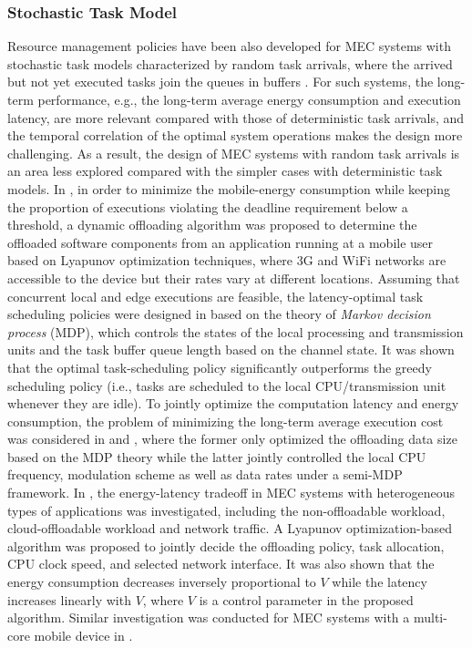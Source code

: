 \documentclass[journal]{IEEEtran}
\begin{document}
\subsubsection{\textbf{Stochastic Task Model}} Resource management policies have been also developed for MEC systems with stochastic task models characterized by random task arrivals, where the arrived but not yet executed tasks join the queues in buffers \cite{DHuangTWC1206,JLiuISIT1607,SChenGLOBECOM1312,hong2016qoe,KwakJSAC1512,ZJiangAccess1511}. For such systems, the long-term performance, e.g., the long-term average energy consumption and execution latency, are more relevant compared with those of deterministic task arrivals, and the temporal correlation of the optimal system operations makes the design more challenging. As a result, the design of MEC systems with random task arrivals is an area less explored compared with the simpler cases with deterministic task models.  In \cite{DHuangTWC1206}, in order to minimize the mobile-energy consumption while keeping the proportion of executions violating the deadline  requirement below a threshold, a dynamic offloading algorithm was proposed to determine the offloaded software components from an application running at a mobile  user based on Lyapunov optimization techniques, where 3G and WiFi networks are accessible to the device but their rates vary at different locations. Assuming that concurrent local and edge executions are feasible, the latency-optimal task scheduling policies were designed  in \cite{JLiuISIT1607} based on the theory of \emph{Markov decision process} (MDP), which controls  the states of the local processing and transmission units and the task buffer queue length based on the  channel state. It was shown that the optimal task-scheduling policy significantly  outperforms the greedy scheduling policy (i.e., tasks are scheduled to the local CPU/transmission unit whenever they are idle).  To jointly optimize the computation  latency and energy consumption, the problem of minimizing the  long-term average execution cost  was considered in \cite{MahmoodiICC1506} and \cite{hong2016qoe}, where the former only optimized the offloading data size based on the  MDP theory while the latter jointly controlled the local CPU frequency, modulation scheme as well as data rates under a semi-MDP framework. In \cite{KwakJSAC1512}, the energy-latency tradeoff in MEC systems with heterogeneous types of applications was investigated, including the non-offloadable workload, cloud-offloadable workload and network traffic. A Lyapunov optimization-based algorithm was proposed to jointly decide the offloading policy, task allocation, CPU clock speed, and selected network interface. It was also shown that the energy consumption decreases inversely proportional to $V$ while the latency increases linearly with $V$, where $V$ is a control parameter in the proposed algorithm. Similar investigation was conducted for MEC systems with a multi-core mobile device in \cite{ZJiangAccess1511}.
\end{document}
